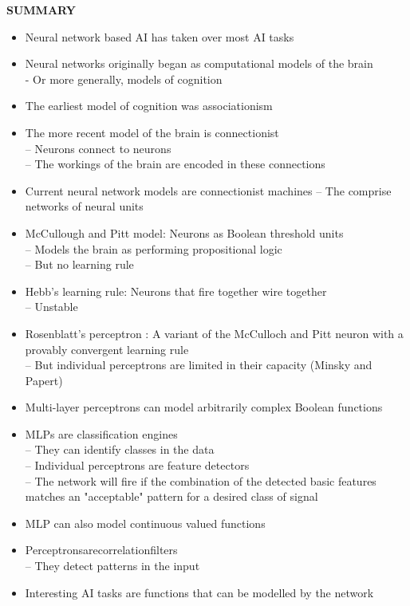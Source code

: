 \documentclass{article}
\begin{document}
		
		
{\LARGE 	\textbf{SUMMARY}}
	
	\begin{itemize}
		\item Neural network based AI has taken over most AI tasks
		\item Neural networks originally began as computational models
		of the brain \\
		- Or more generally, models of cognition
		\item The earliest model of cognition was associationism
		\item The more recent model of the brain is connectionist \\
		– Neurons connect to neurons \\
		– The workings of the brain are encoded in these connections 
		\item Current neural network models are connectionist machines
		– The comprise networks of neural units
		\item McCullough and Pitt model: Neurons as Boolean threshold units \\
		– Models the brain as performing propositional logic \\
		– But no learning rule
		\item Hebb’s learning rule: Neurons that fire together wire together \\
		– Unstable
		\item Rosenblatt’s perceptron : A variant of the McCulloch and Pitt neuron with a provably convergent learning rule \\
		– But individual perceptrons are limited in their capacity (Minsky and Papert) 
		\item Multi-layer perceptrons can model arbitrarily complex Boolean functions
		\item MLPs are classification engines \\
		– They can identify classes in the data \\ 
		– Individual perceptrons are feature detectors \\
		– The network will fire if the combination of the detected basic features matches an "acceptable" pattern for a desired class of signal
		\item MLP can also model continuous valued functions
		\item Perceptronsarecorrelationfilters \\
		– They detect patterns in the input
		\item Interesting AI tasks are functions that can be modelled by the network
		
	\end{itemize}
\end{document}
